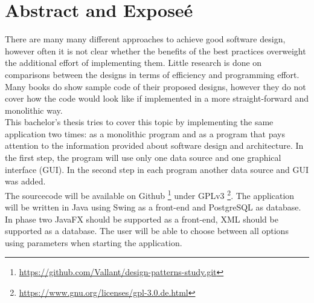 \chapter{Abstract and Exposeé}

There are many many different approaches to achieve good software design, however often it is not clear whether the benefits of the best practices overweight the additional effort of implementing them. Little research is done on comparisons between the designs in terms of efficiency and programming effort. Many books do show sample code of their proposed designs, however they do not cover how the code would look like if implemented in a more straight-forward and monolithic way.\\

This bachelor's thesis tries to cover this topic by implementing the same application two times: as a monolithic program and as a program that pays attention to the information provided about software design and architecture. In the first step, the program will use only one data source and one graphical interface (GUI). In the second step in each program another data source and GUI was added. \\

The sourcecode will be available on Github \footnote{\href{https://github.com/Vallant/design-patterns-study.git}{https://github.com/Vallant/design-patterns-study.git}} under GPLv3 \footnote{\href{https://www.gnu.org/licenses/gpl-3.0.de.html}{https://www.gnu.org/licenses/gpl-3.0.de.html}}. The application will be written in Java using Swing as a front-end and PostgreSQL as database. In phase two JavaFX should be supported as a front-end, XML should be supported as a database. The user will be able to choose between all options using parameters when starting the application.
